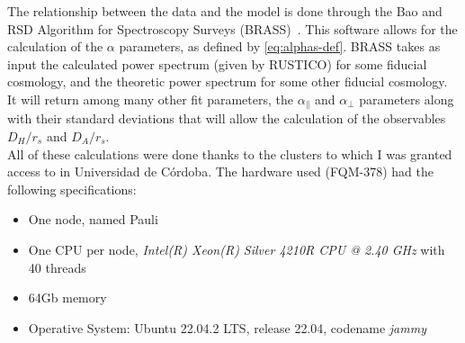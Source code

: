 The relationship between the data and the model is done through the Bao and RSD Algorithm for Spectroscopy Surveys (BRASS)~\cite{brass}. This software allows for the calculation of the $\alpha$ parameters, as defined by \eqref{eq:alphas-def}. BRASS takes as input the calculated power spectrum (given by RUSTICO) for some  fiducial cosmology, and the theoretic power spectrum for some other fiducial cosmology. It will return among many other fit parameters, the $\alpha_\parallel$ and $\alpha_\perp$ parameters along with their standard deviations that will allow the calculation of the observables $D_H/r_s$ and $D_A /r_s$.\\

All of these calculations were done thanks to the clusters to which I was granted access to in Universidad de Córdoba. The hardware used (FQM-378) had the following specifications:
\begin{itemize}
	\item One node, named Pauli
	\item One CPU per node, \textit{Intel(R) Xeon(R) Silver 4210R CPU @ 2.40 GHz} with 40 threads
	\item 64Gb memory
	\item Operative System: Ubuntu 22.04.2 LTS, release 22.04, codename \textit{jammy}
\end{itemize}
